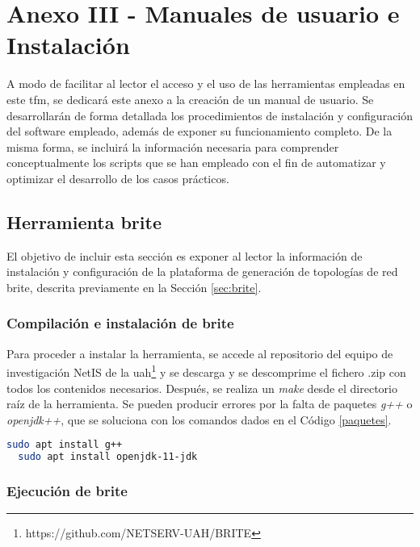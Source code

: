 \chapter{Anexo III - Manuales de usuario e Instalación}

A modo de facilitar al lector el acceso y el uso de las herramientas empleadas en este \gls{tfm}, se dedicará este anexo a la creación de un manual de usuario. Se desarrollarán de forma detallada los procedimientos de instalación y configuración del software empleado, además de exponer su funcionamiento completo. De la misma forma, se incluirá la información necesaria para comprender conceptualmente los scripts que se han empleado con el fin de automatizar y optimizar el desarrollo de los casos prácticos.

\section{Herramienta \acrshort{brite}}
\label{sec:manualbrite}

El objetivo de incluir esta sección es exponer al lector la información de instalación y configuración de la plataforma de generación de topologías de red \gls{brite}, descrita previamente en la Sección \ref{sec:brite}.

\subsection{Compilación e instalación de \acrshort{brite}}

Para proceder a instalar la herramienta, se accede al repositorio del equipo de investigación NetIS de la \gls{uah}\footnote{https://github.com/NETSERV-UAH/BRITE} y se descarga y se descomprime el fichero .zip con todos los contenidos necesarios. Después, se realiza un \textit{make} desde el directorio raíz de la herramienta. Se pueden producir errores por la falta de paquetes \textit{g++} o \textit{openjdk++}, que se soluciona con los comandos dados en el Código \ref{paquetes}.

\begin{lstlisting}[language=bash, style=Consola, caption={Instalación de paquetes}, label={paquetes}]
  sudo apt install g++
  sudo apt install openjdk-11-jdk
\end{lstlisting}

\subsection{Ejecución de \acrshort{brite}}

